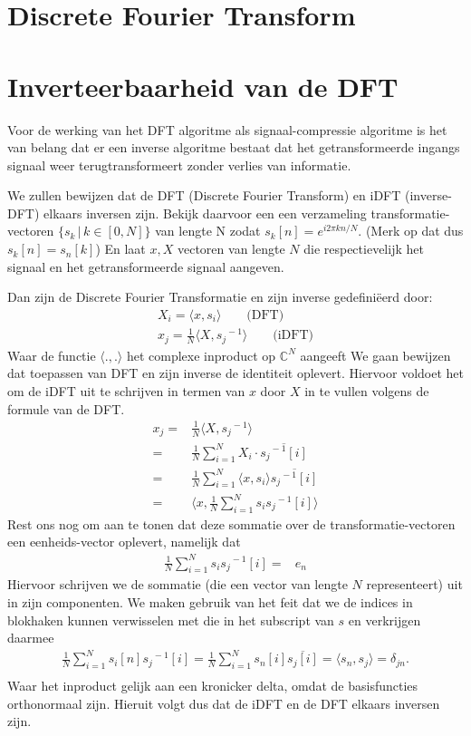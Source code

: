 \documentclass[11pt]{amsart}
\newcommand{\C}{\mathbb{C}}
\newcommand{\eq}[1]{\begin{eqnarray*} #1 \end{eqnarray*}}
\newcommand{\repr}[1]{{#1}^{\!\!-1}}
\begin{document}
\section{Discrete Fourier Transform}
{}
\section{Inverteerbaarheid van de DFT}
Voor de werking van het DFT algoritme als signaal-compressie algoritme is het van belang dat er een inverse algoritme bestaat dat het getransformeerde ingangs signaal weer terugtransformeert zonder verlies van informatie.\bigskip

We zullen bewijzen dat de DFT (Discrete Fourier Transform) en iDFT (inverse-DFT) elkaars inversen zijn.
Bekijk daarvoor een een verzameling transformatie-vectoren $\{s_k\, |\, k\in [0,N]\}$ van lengte N zodat $s_k[n] = e^{i2\pi k n /N}$.
(Merk op dat dus $s_k[n]= s_n[k]$)
En laat $x,X$ vectoren van lengte $N$ die respectievelijk het signaal en het getransformeerde signaal aangeven.\bigskip

Dan zijn de Discrete Fourier Transformatie en zijn inverse gedefini\"eerd door:
\eq{
  X_i = \langle x, s_i \rangle \quad\quad \text{(DFT)}\\
  x_j = \frac 1 N \langle X, \repr{s_j} \rangle \quad\quad\text{(iDFT)}
}
Waar de functie $\langle . , . \rangle$ het complexe inproduct op $\C^N$ aangeeft
We gaan bewijzen dat toepassen van DFT en zijn inverse de identiteit oplevert.
Hiervoor voldoet het om de iDFT uit te schrijven in termen van $x$ door $X$ in te vullen volgens de formule van de DFT.
\eq{
  x_j =& \frac 1 N \langle X , \repr{s_j} \rangle \\
      =& \frac 1 N \sum_{i=1}^N X_i\cdot \overline{\repr{s_j}[i]} \\
      =& \frac 1 N \sum_{i=1}^N \langle x , s_i \rangle \overline{\repr{s_j}[i]} \\
      =& \langle x , \frac1N \sum_{i=1}^N s_i \repr{s_j}[i] \rangle
}
Rest ons nog om aan te tonen dat deze sommatie over de transformatie-vectoren een eenheids-vector oplevert, namelijk dat
\eq{
  \frac1N \sum_{i=1}^N s_i \repr{s_j}[i] =& e_n
}
Hiervoor schrijven we de sommatie (die een vector van lengte $N$ representeert) uit in zijn componenten. We maken gebruik van het feit
dat we de indices in blokhaken kunnen verwisselen met die in het subscript van $s$ en verkrijgen daarmee
\eq{
  \frac1N \sum_{i=1}^N s_i[n] \repr{s_j}[i] = \frac1N \sum_{i=1}^N s_n[i] \overline{s_j[i]} = \langle s_n , s_j \rangle = \delta_{jn}.\\
}
Waar het inproduct gelijk aan een kronicker delta, omdat de basisfuncties orthonormaal zijn.
Hieruit volgt dus dat de iDFT en de DFT elkaars inversen zijn.
\end{document}
